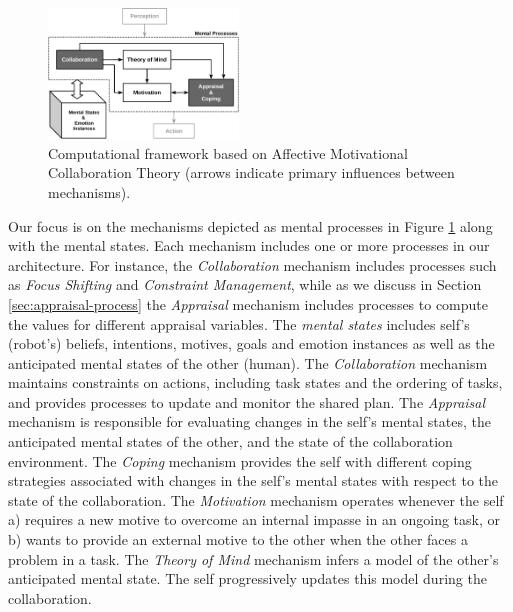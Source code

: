 \documentclass{sig-alternate-05-2015}
\begin{document}
\vspace*{-3mm}
\begin{figure}[tbh]
  \centering
  \includegraphics[width=0.45\textwidth]{figure/theory-general-croped.pdf}
  \vspace*{-3mm}
  \caption{{\fontsize{9}{9}\selectfont Computational framework based on
  Affective Motivational Collaboration Theory (arrows indicate primary
  influences between mechanisms).}}
  \vspace*{-3mm}
  \label{fig:cpm}
\end{figure}

Our focus is on the mechanisms depicted as mental processes in Figure
\ref{fig:cpm} along with the mental states. Each mechanism includes one or
more processes in our architecture. For instance, the \textit{Collaboration}
mechanism includes processes such as \textit{Focus Shifting} and
\textit{Constraint Management}, while as we discuss in Section
\ref{sec:appraisal-process} the \textit{Appraisal} mechanism includes processes
to compute the values for different appraisal variables. The \textit{mental
states} includes self's (robot's) beliefs, intentions, motives, goals and
emotion instances as well as the anticipated mental states of the other (human).
The \textit{Collaboration} mechanism maintains constraints on actions, including
task states and the ordering of tasks, and provides processes to update and
monitor the shared plan. The \textit{Appraisal} mechanism is responsible for
evaluating changes in the self's mental states, the anticipated mental states of
the other, and the state of the collaboration environment. The \textit{Coping}
mechanism provides the self with different coping strategies associated with
changes in the self's mental states with respect to the state of the
collaboration. The \textit{Motivation} mechanism operates whenever the self a)
requires a new motive to overcome an internal impasse in an ongoing task, or b)
wants to provide an external motive to the other when the other faces a problem
in a task. The \textit{Theory of Mind} mechanism infers a model of the other's
anticipated mental state. The self progressively updates this model during the
collaboration.
\end{document}
